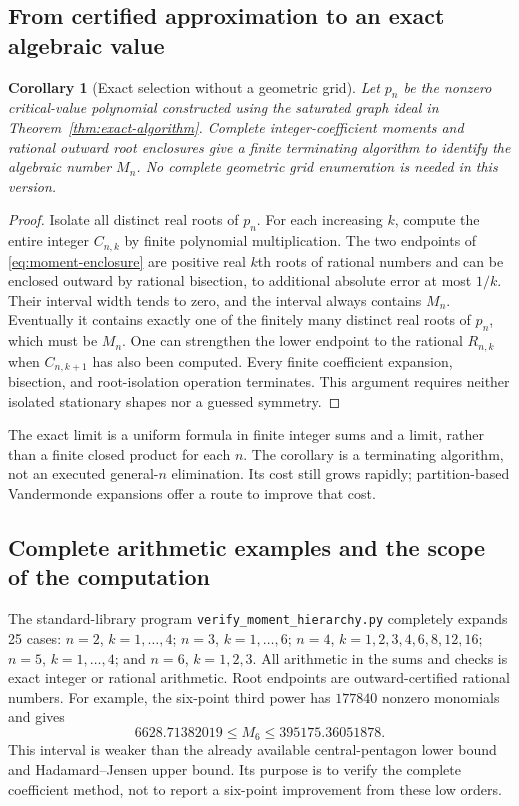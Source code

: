 \documentclass[11pt]{article}
\newtheorem{corollary}[theorem]{Corollary}
\theoremstyle{remark}
\numberwithin{equation}{section}
\begin{document}
\subsection{From certified approximation to an exact algebraic value}
\begin{corollary}[Exact selection without a geometric grid]
\label{cor:moment-exact-selection}
Let $p_n$ be the nonzero critical-value polynomial constructed
using the saturated graph ideal in
Theorem~\ref{thm:exact-algorithm}. Complete integer-coefficient
moments and rational outward root enclosures give a finite
terminating algorithm to identify the algebraic number $M_n$.
No complete geometric grid enumeration is needed in this version.
\end{corollary}
\begin{proof}
Isolate all distinct real roots of $p_n$. For each increasing $k$,
compute the entire integer $C_{n,k}$ by finite polynomial
multiplication. The two endpoints of
\eqref{eq:moment-enclosure} are positive real $k$th roots of rational
numbers and can be enclosed outward by rational bisection, to
additional absolute error at most $1/k$. Their interval width
tends to zero, and the interval always contains $M_n$.
Eventually it contains exactly one of the finitely many distinct
real roots of $p_n$, which must be $M_n$. One can strengthen the
lower endpoint to the rational $R_{n,k}$ when $C_{n,k+1}$ has also
been computed. Every finite coefficient expansion, bisection,
and root-isolation operation terminates. This argument requires
neither isolated stationary shapes nor a guessed symmetry.
\end{proof}

The exact limit is a uniform formula in finite integer sums and a
limit, rather than a finite closed product for each $n$. The
corollary is a terminating algorithm, not an executed general-$n$
elimination. Its cost still grows rapidly; partition-based
Vandermonde expansions \cite{TF} offer a route to improve that cost.

\subsection{Complete arithmetic examples and the scope of the computation}
The standard-library program \texttt{verify\_moment\_hierarchy.py}
completely expands 25 cases: $n=2$, $k=1,\ldots,4$;
$n=3$, $k=1,\ldots,6$; $n=4$, $k=1,2,3,4,6,8,12,16$;
$n=5$, $k=1,\ldots,4$; and $n=6$, $k=1,2,3$.
All arithmetic in the sums and checks is exact integer or rational
arithmetic. Root endpoints are outward-certified rational numbers.
For example, the six-point third power has $177840$ nonzero
monomials and gives
\[
 6628.71382019\le M_6\le395175.36051878.
\]
This interval is weaker than the already available central-pentagon
lower bound and Hadamard--Jensen upper bound. Its purpose is to
verify the complete coefficient method, not to report a six-point
improvement from these low orders.
\end{document}
